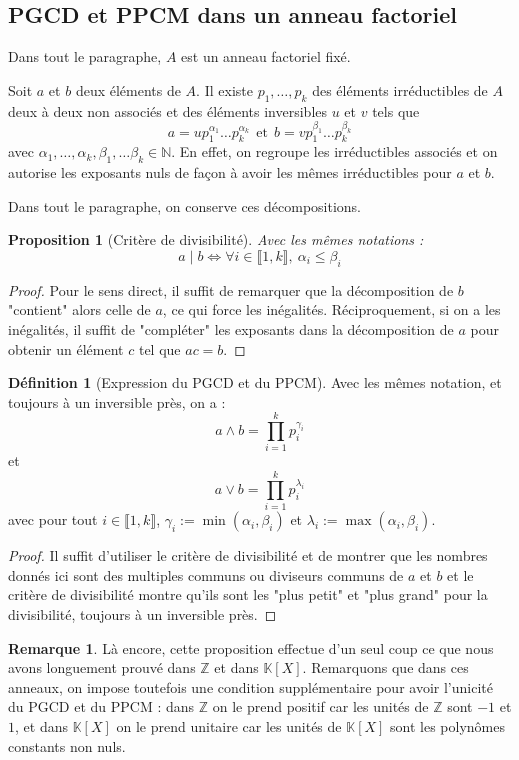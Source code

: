 \documentclass[french]{book}
\newcommand{\N}{\mathbb{N}}
\newcommand{\Z}{\mathbb{Z}}
\newcommand{\K}{\mathbb{K}}
\theoremstyle{plain}
\newtheorem{prop}{Proposition}[chapter]
\theoremstyle{definition}
\newtheorem{dfn}{Définition}[chapter]
\newtheorem{rmq}{Remarque}[chapter]
\theoremstyle{remark}
\begin{document}
\subsection{PGCD et PPCM dans un anneau factoriel}
Dans tout le paragraphe, $A$ est un anneau factoriel fixé. \\ \par  Soit $a$ et $b$ deux éléments de $A$. Il existe $p_1,\ldots,p_k$ des éléments irréductibles de $A$ deux à deux non associés et des éléments inversibles $u$ et $v$ tels que $$a=up_1^{\alpha_1}\ldots p_k^{\alpha_k} \ \ \text{et}\ \ b=vp_1^{\beta_1}\ldots p_k^{\beta_k}$$ avec $\alpha_1,\ldots,\alpha_k,\beta_1,\ldots\beta_k\in\N$. En effet, on regroupe les irréductibles associés et on autorise les exposants nuls de façon à avoir les mêmes irréductibles pour $a$ et $b$. \\ \par Dans tout le paragraphe, on conserve ces décompositions.
\begin{prop}[Critère de divisibilité]
	Avec les mêmes notations : $$a\mid b\iff \forall i\in\llbracket1,k\rrbracket,\ \alpha_i\leqslant\beta_i$$
\end{prop}
\begin{proof}
	Pour le sens direct, il suffit de remarquer que la décomposition de $b$ "contient" alors celle de $a$, ce qui force les inégalités. Réciproquement, si on a les inégalités, il suffit de "compléter" les exposants dans la décomposition de $a$ pour obtenir un élément $c$ tel que $ac=b$.
\end{proof}
\begin{dfn}[Expression du PGCD et du PPCM]
	Avec les mêmes notation, et toujours à un inversible près, on a : $$a\wedge b=\prod_{i=1}^{k}p_i^{\gamma_i}$$ et $$a\vee b=\prod_{i=1}^{k}p_i^{\lambda_i}$$ avec pour tout $i\in\llbracket1,k\rrbracket$, $\gamma_i:=\min(\alpha_i,\beta_i)$ et $\lambda_i:=\max(\alpha_i,\beta_i)$.
\end{dfn}
\begin{proof}
	Il suffit d'utiliser le critère de divisibilité et de montrer que les nombres donnés ici sont des multiples communs ou diviseurs communs de $a$ et $b$ et le critère de divisibilité montre qu'ils sont les "plus petit" et "plus grand" pour la divisibilité, toujours à un inversible près.
\end{proof}
\begin{rmq}
	Là encore, cette proposition effectue d'un seul coup ce que nous avons longuement prouvé dans $\Z$ et dans $\K[X]$. Remarquons que dans ces anneaux, on impose toutefois une condition supplémentaire pour avoir l'unicité du PGCD et du PPCM : dans $\Z$ on le prend positif car les unités de $\Z$ sont $-1$ et $1$, et dans $\K[X]$ on le prend unitaire car les unités de $\K[X]$ sont les polynômes constants non nuls.
\end{rmq}
\end{document}

